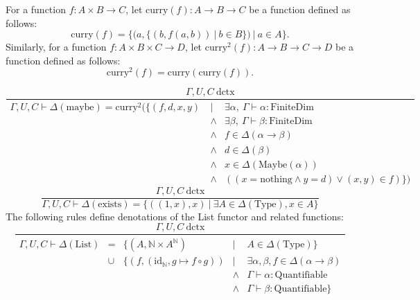 \documentclass[11pt]{article}
\begin{document}
For a function $f : A \times B \to C$, let $\text{curry}(f) : A \to B \to C$ be a function
defined as follows:
\begin{equation}
	\text{curry}(f) = \{(a, \{(b, f(a, b))\ |\ b \in B\})\ |\ a \in A\}.
\end{equation}
Similarly, for a function $f : A \times B \times C \to D$, let
$\text{curry}^2(f) : A \to B \to C \to D$ be a function defined as follows:
\begin{equation}
	\text{curry}^2(f) = \text{curry}(\text{curry}(f)).
\end{equation}

\begin{equation}
	\frac{\Gamma,U,C\ \text{dctx}}
	{
		\begin{array}{rcl}
			\Gamma,U,C \vdash \Delta(\text{maybe}) =
			\text{curry}^2(\{(f,d,x,y)\
			&|\
			&\exists \alpha,\ \Gamma \vdash \alpha : \text{FiniteDim}
			\\ &\wedge
			& \exists \beta,\ \Gamma \vdash \beta : \text{FiniteDim}
			\\ &\wedge
			& f \in \Delta(\alpha \to \beta)
			\\ &\wedge
			& d \in \Delta(\beta)
			\\ &\wedge
			& x \in \Delta(\text{Maybe}(\alpha))
			\\ & \wedge
			& ((x = \text{nothing} \wedge y = d)
				\vee (x,y) \in f)\})
		\end{array}
	}
\end{equation}
\begin{equation}
	\frac{\Gamma,U,C\ \text{dctx}}
	{\Gamma,U,C \vdash \Delta(\text{exists}) = \{((1,x), x)\ |\ \exists
	A \in \Delta(\text{Type}), x \in A\}}
\end{equation}
The following rules define denotations of the List functor
and related functions:
\begin{equation}
	\frac{\Gamma,U,C\ \text{dctx}}
	{
		\begin{array}{rclcl}
			\Gamma,U,C \vdash \Delta(\text{List})
			&=
			& \{(A, \mathbb{N} \times A^{\mathbb{N}})
			& |
			& A \in \Delta(\text{Type})\}
			\\ & \cup
			& \{(f, (\text{id}_{\mathbb{N}}, g \mapsto f \circ g))
			& |
			& \exists \alpha, \beta, f \in \Delta(\alpha \to \beta)
			\\ &&& \wedge
			& \Gamma \vdash \alpha : \text{Quantifiable}
			\\ &&& \wedge
			& \Gamma \vdash \beta : \text{Quantifiable}\}
		\end{array}
	}
\end{equation}
\end{document}
